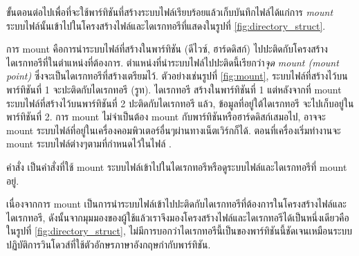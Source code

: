 \begin{thwbr}
\begin{figure}[!htb]
\end{figure}

ขั้นตอนต่อไปเพื่อที่จะใช้พาร์ทิชันที่สร้างระบบไฟล์เรียบร้อยแล้วเก็บบันทึกไฟล์ได้แก่การ \emph{mount} ระบบไฟล์นั้นเข้าไปในโครงสร้างไฟล์และไดเรกทอรีที่แสดงในรูปที่ \ref{fig:directory_struct}. 

การ mount คือการนำระบบไฟล์ที่สร้างในพาร์ทิชัน (ดีไวซ์, ฮาร์ดดิสก์) ไปปะติดกับโครงสร้างไดเรกทอรีที่ในตำแหน่งที่ต้องการ. ตำแหน่งที่นำระบบไฟล์ไปปะติดนี้เรียกว่า\emph{จุด mount (mount point)} ซึ่งจะเป็นไดเรกทอรีที่สร้างเตรียมไว้. ตัวอย่างเช่นรูปที่ \ref{fig:mount}, ระบบไฟล์ที่สร้างไว้บนพาร์ทิชันที่ 1 จะปะติดกับไดเรกทอรี \cmd{/} (รูท). ไดเรกทอรี  สร้างในพาร์ทิชันที่ 1 แต่หลังจากที่ mount ระบบไฟล์ที่สร้างไว้บนพาร์ทิชันที่ 2 ปะติดกับไดเรกทอรี  แล้ว, ข้อมูลที่อยู่ใต้ไดเรกทอรี  จะไปเก็บอยู่ในพาร์ทิชันที่ 2. การ mount ไม่จำเป็นต้อง mount กับพาร์ทิชันหรือฮาร์ดดิสก์เสมอไป, อาจจะ mount ระบบไฟล์ที่อยู่ในเครื่องคอมพิวเตอร์อื่นๆผ่านทางเน็ตเวิร์กก็ได้. ตอนที่เครื่องเริ่มทำงานจะ mount ระบบไฟล์ต่างๆตามที่กำหนดไว้ในไฟล์ .

\bigskip
คำสั่ง  เป็นคำสั่งที่ใช้ mount ระบบไฟล์เข้าไปในไดเรกทอรีหรือดูระบบไฟล์และไดเรกทอรีที่ mount อยู่.

\begin{MyExample}
\end{MyExample}%

เนื่องจากการ mount เป็นการนำระบบไฟล์เข้าไปปะติดกับไดเรกทอรีที่ต้องการในโครงสร้างไฟล์และไดเรกทอรี, ดังนั้นจากมุมมองของผู้ใช้แล้วเราจึงมองโครงสร้างไฟล์และไดเรกทอรีได้เป็นหนึ่งเดียวคือในรูปที่ \ref{fig:directory_struct}, ไม่มีการบอกว่าไดเรกทอรีนี้เป็นของพาร์ทิชันนี้ชัดเจนเหมือนระบบปฏิบัติการวินโดวส์ที่ใช้ตัวอักษรภาษาอังกฤษกำกับพาร์ทิชัน.



\end{thwbr}
